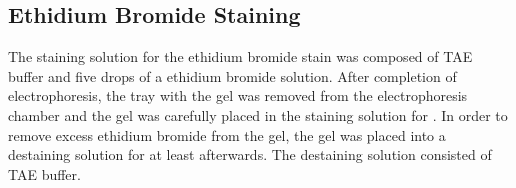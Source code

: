 \subsection{Ethidium Bromide Staining}
The staining solution for the ethidium bromide stain was composed of  TAE buffer and five drops of a  ethidium bromide solution. After completion of electrophoresis, the tray with the gel was removed from the electrophoresis chamber and the gel was carefully placed in the staining solution for . In order to remove excess ethidium bromide from the gel, the gel was placed into a destaining solution for at least  afterwards. The destaining solution consisted of  TAE buffer.

